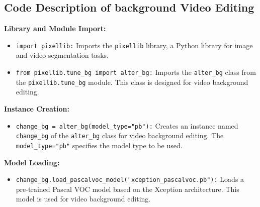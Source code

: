 \subsection*{Code Description of background Video Editing}

\textbf{Library and Module Import:}
\begin{itemize}
    \item \texttt{import pixellib:} Imports the \texttt{pixellib} library, a Python library for image and video segmentation tasks.
    \item \texttt{from pixellib.tune\_bg import alter\_bg:} Imports the \texttt{alter\_bg} class from the \texttt{pixellib.tune\_bg} module. This class is designed for video background editing.
\end{itemize}

\textbf{Instance Creation:}
\begin{itemize}
    \item \texttt{change\_bg = alter\_bg(model\_type="pb"):} Creates an instance named \texttt{change\_bg} of the \texttt{alter\_bg} class for video background editing. The \texttt{model\_type="pb"} specifies the model type to be used.
\end{itemize}

\textbf{Model Loading:}
\begin{itemize}
    \item \texttt{change\_bg.load\_pascalvoc\_model("xception\_pascalvoc.pb"):} Loads a pre-trained Pascal VOC model based on the Xception architecture. This model is used for video background editing.
\end{itemize}

